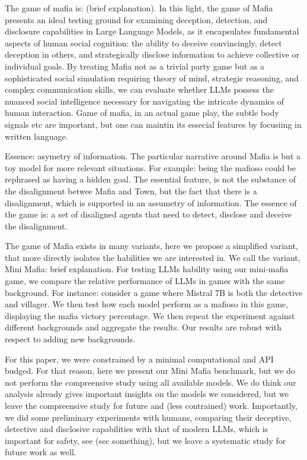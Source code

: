 \documentclass{article}
\begin{document}
The game of mafia is: (brief explanation).
In this light, the game of Mafia presents an ideal testing ground for examining deception, detection, and disclosure capabilities in Large Language Models, as it encapsulates fundamental aspects of human social cognition: the ability to deceive convincingly, detect deception in others, and strategically disclose information to achieve collective or individual goals. 
By treating Mafia not as a trivial party game but as a sophisticated social simulation requiring theory of mind, strategic reasoning, and complex communication skills, we can evaluate whether LLMs possess the nuanced social intelligence necessary for navigating the intricate dynamics of human interaction.
Game of mafia, in an actual game play, the subtle body signals etc are important, but one can maintin its essecial features by focusiing in written language.

Essence: asymetry of information.
The particular narrative around Mafia is but a toy model for more relevant situations. For example: being the mafioso could be rephrased as having a hidden goal. The essential feature, is not the substance of the disalignment betwee Mafia and Town, but the fact that there is a disalignment, which is supported in an assumetry of information. 
The essence of the game is: a set of disaligned agents that need to detect, disclose and deceive the disalignment. 

The game of Mafia exists in many variants, here we propose a simplified variant, that more directly isolates the habilities we are interested in. 
We call the variant, Mini Mafia: brief explanation.
For testing LLMs hability using our mini-mafia game, we compare the relative performance of LLMs in games with the same background. For instance: consider a game where Mistral 7B is both the detective and villager. We then test how each model perform as a mafioso in this game, displaying the mafia victory percentage. We then repeat the experiment against different backgrounds and aggregate the results.
Our results are robust with respect to adding new backgrounds.

For this paper, we were constrained by a minimal computational and API budged. 
For that reason, here we present our Mini Mafia benchmark, but we do not perform the compreensive study using all available models.
We do think our analysis already gives important insights on the models we considered, but we leave the compreensive study for future and (less contrained) work.
Importantly, we did some preliminary experiments with humans, comparing their deceptive, detective and disclosive capabilities with that of modern LLMs, which is important for safety, see (sec something), but we leave a systematic study for future work as well.
\end{document}
